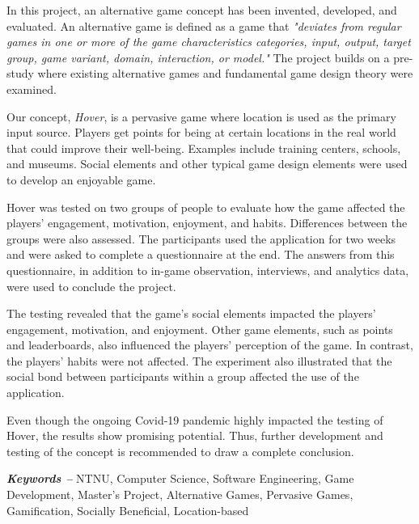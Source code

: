 In this project, an alternative game concept has been invented, developed, and evaluated. An alternative game is defined as a game that \textit{"deviates from regular games in one or more of the game characteristics categories, input, output, target group, game variant, domain, interaction, or model."} The project builds on a pre-study where existing alternative games and fundamental game design theory were examined.

Our concept, \textit{Hover}, is a pervasive game where location is used as the primary input source. Players get points for being at certain locations in the real world that could improve their well-being. Examples include training centers, schools, and museums. Social elements and other typical game design elements were used to develop an enjoyable game.

Hover was tested on two groups of people to evaluate how the game affected the players’ engagement, motivation, enjoyment, and habits. Differences between the groups were also assessed. The participants used the application for two weeks and were asked to complete a questionnaire at the end. The answers from this questionnaire, in addition to in-game observation, interviews, and analytics data, were used to conclude the project.

The testing revealed that the game’s social elements impacted the players’ engagement, motivation, and enjoyment. Other game elements, such as points and leaderboards, also influenced the players’ perception of the game. In contrast, the players’ habits were not affected. The experiment also illustrated that the social bond between participants within a group affected the use of the application.

Even though the ongoing Covid-19 pandemic highly impacted the testing of Hover, the results show promising potential. Thus, further development and testing of the concept is recommended to draw a complete conclusion.

\par\vspace*{\fill} %

\textbf{\textit{Keywords --}} NTNU, Computer Science, Software Engineering, Game Development, Master’s Project, Alternative Games, Pervasive Games, Gamification, Socially Beneficial, Location-based %